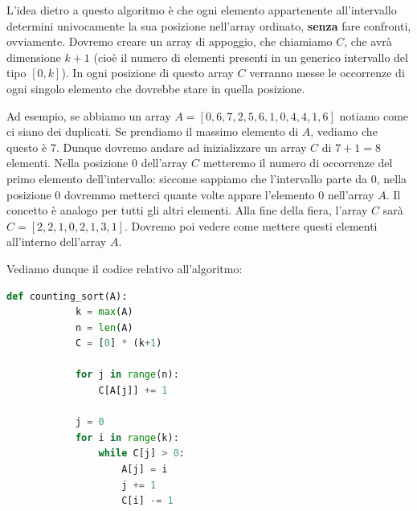 \documentclass[12pt]{report}
\begin{document}
    L'idea dietro a questo algoritmo è che ogni elemento appartenente all'intervallo determini univocamente la sua posizione nell'array ordinato, \textbf{senza} fare confronti, ovviamente.
    Dovremo creare un array di appoggio, che chiamiamo $C$, che avrà dimensione $k+1$ (cioè il numero di elementi presenti in un generico intervallo del tipo $[0, k]$). In ogni posizione di questo array $C$ verranno messe le occorrenze di ogni singolo elemento che dovrebbe stare in quella posizione. 
    
    Ad esempio, se abbiamo un array $A = [0, 6, 7, 2, 5, 6, 1, 0, 4, 4, 1, 6]$ notiamo come ci siano dei duplicati. Se prendiamo il massimo elemento di $A$, vediamo che questo è $7$. Dunque dovremo andare ad inizializzare un array $C$ di $7+1=8$ elementi. Nella posizione $0$ dell'array $C$ metteremo il numero di occorrenze del primo elemento dell'intervallo: siccome sappiamo che l'intervallo parte da $0$, nella posizione $0$ dovremmo metterci quante volte appare l'elemento $0$ nell'array $A$. Il concetto è analogo per tutti gli altri elementi. Alla fine della fiera, l'array $C$ sarà $C = [2, 2, 1, 0, 2, 1, 3, 1]$. Dovremo poi vedere come mettere questi elementi all'interno dell'array $A$.
    
    Vediamo dunque il codice relativo all'algoritmo:
    
    \begin{lstlisting}[language=Python, caption={Codice base dell'algoritmo Counting Sort}]
    	def counting_sort(A):
    		k = max(A)
    		n = len(A)
    		C = [0] * (k+1)
    		
    		for j in range(n):
    			C[A[j]] += 1
    			
    		j = 0
    		for i in range(k):
    			while C[j] > 0:
    				A[j] = i
    				j += 1
    				C[i] -= 1
    \end{lstlisting}
    
\end{document}
